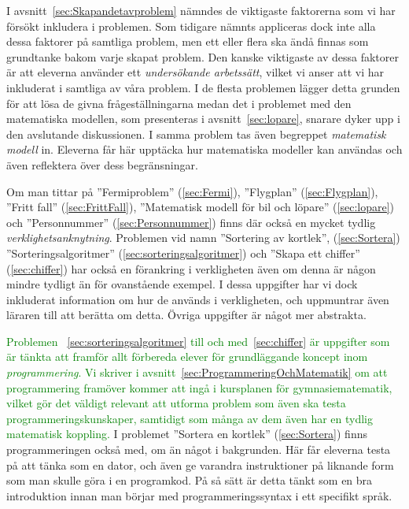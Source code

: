 \textcolor{lila}{I avsnitt~\ref{sec:Skapandetavproblem} nämndes de viktigaste faktorerna som vi har försökt inkludera i problemen. Som tidigare nämnts appliceras dock inte alla dessa faktorer på samtliga problem, men ett eller flera ska ändå finnas som grundtanke bakom varje skapat problem. Den kanske viktigaste av dessa faktorer är att eleverna använder ett \textsl{undersökande arbetssätt}, vilket vi anser att vi har inkluderat i samtliga av våra problem. I de flesta problemen lägger detta grunden för att lösa de givna frågeställningarna medan det i problemet med den matematiska modellen, som presenteras i avsnitt~\ref{sec:lopare}, snarare dyker upp i den avslutande diskussionen. I samma problem tas även begreppet \textsl{matematisk modell} in. Eleverna får här upptäcka hur matematiska modeller kan användas och även reflektera över dess begränsningar.} 

\textcolor{lila}{Om man tittar på ''Fermiproblem'' (\ref{sec:Fermi}), ''Flygplan'' (\ref{sec:Flygplan}), ''Fritt fall'' (\ref{sec:FrittFall}), ''Matematisk modell för bil och löpare'' (\ref{sec:lopare}) och ''Personnummer'' (\ref{sec:Personnummer}) finns där också en mycket tydlig \textsl{verklighetsanknytning}. Problemen vid namn ''Sortering av kortlek'', (\ref{sec:Sortera}) ''Sorteringsalgoritmer'' (\ref{sec:sorteringsalgoritmer}) och ''Skapa ett chiffer'' (\ref{sec:chiffer}) har också en förankring i verkligheten även om denna är någon mindre tydligt än för ovanstående exempel. I dessa uppgifter har vi dock inkluderat information om hur de används i verkligheten, och uppmuntrar även läraren till att berätta om detta. Övriga uppgifter är något mer abstrakta.}

\textcolor{green}{Problemen ~\ref{sec:sorteringsalgoritmer} till och med~\ref{sec:chiffer} är uppgifter som är tänkta att framför allt förbereda elever för grundläggande koncept inom \textsl{programmering}. Vi skriver i avsnitt~\ref{sec:ProgrammeringOchMatematik} om att programmering framöver kommer att ingå i kursplanen för gymnasiematematik, vilket gör det väldigt relevant att utforma problem som även ska testa programmeringskunskaper, samtidigt som många av dem även har en tydlig matematisk koppling.} \textcolor{lila}{I problemet ''Sortera en kortlek'' (\ref{sec:Sortera}) finns programmeringen också med, om än något i bakgrunden. Här får eleverna testa på att tänka som en dator, och även ge varandra instruktioner på liknande form som man skulle göra i en programkod. På så sätt är detta tänkt som en bra introduktion innan man börjar med programmeringssyntax i ett specifikt språk.}

